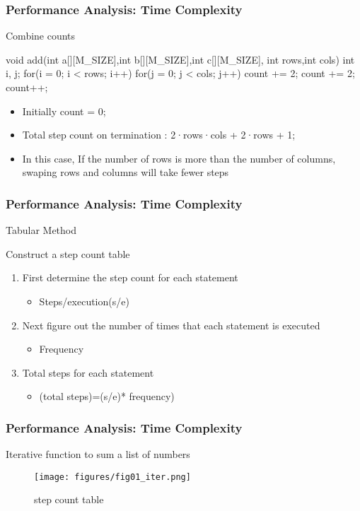 \documentclass[newPxFont,sthlmFooter,nooffset]{beamer}
\begin{document}
\begin{frame}[t, fragile]
  \frametitle{Performance Analysis: Time Complexity}
Combine counts
\begin{codedef}
void add(int a[][M_SIZE],int b[][M_SIZE],int c[][M_SIZE],
         int rows,int cols) {
   int i, j;
   for(i = 0; i < rows; i++) {
      for(j = 0; j < cols; j++)
         count += 2;
      count += 2; 
      }
   count++; 
}
\end{codedef}
\begin{itemize}
\item Initially count = 0;
\item Total step count on termination : 2·rows·cols + 2·rows + 1;
\item In this case, If the number of rows is more than the number of columns, swaping rows and columns will take fewer steps
\end{itemize}
\end{frame}


\begin{frame}[t]
  \frametitle{Performance Analysis: Time Complexity}
Tabular Method

Construct a step count table
\begin{enumerate}
\item First determine the step count for each statement
  \begin{itemize}
  \item Steps/execution(s/e)
  \end{itemize}

\item Next figure out the number of times that
  each statement is executed
  \begin{itemize}
  \item Frequency
  \end{itemize}

\item Total steps for each
  statement
  \begin{itemize}
  \item (total steps)=(s/e)* frequency)
  \end{itemize}

\end{enumerate}

\end{frame}


\begin{frame}[t]
  \frametitle{Performance Analysis: Time Complexity}
Iterative function to sum a list of numbers
  \begin{figure}[h]
    \centering
    \texttt{[image: figures/fig01\_iter.png]}
    \caption{step count table}
  \end{figure}
\end{frame}
\end{document}
